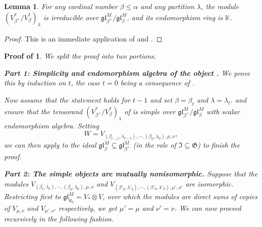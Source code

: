 \documentclass[11pt]{article}
\theoremstyle{plain}
\newtheorem{lemma}{Lemma}[section]
\theoremstyle{nonumberplain}
\theoremstyle{plain}
\theoremstyle{nonumberplain}
\newtheorem{proof}{Proof}
\newtheorem{proof-of-simples}{Proof of \Cref{pr.simples}}
\newcommand\bK{\mathbb K}
\newcommand\fG{\mathfrak{G}}
\newcommand\fgl{\mathfrak{gl}}
\begin{document}
\begin{lemma}\label{le.lambdas}
  For any cardinal number $\beta\le \alpha$ and any partition
  $\lambda$, the module $(V^*_{\beta^+}/V^*_\beta)_\lambda$ is
  irreducible over $\fgl^M_{\beta^+}/\fgl^M_\beta$, and its
  endomorphism ring is $\bK$.
\end{lemma}
\begin{proof}
  This is an immediate application of  and .
\end{proof}






\begin{proof-of-simples}
We split the proof into two portions. 



{\bf Part 1: Simplicity and endomorphism algebra of the object .} We
prove this by induction on $t$, the case $t=0$ being a consequence of \cite[Theorem 4.1]{PS2}.

Now assume that the statement holds for $t-1$ and set $\beta=\beta_t$
and $\lambda=\lambda_t$.  and  ensure that the tensorand
$(V^*_{\beta^+}/V^*_\beta)_\lambda$ of  is
simple over $\fgl^M_{\beta^+}/\fgl^M_{\beta}$ with scalar endomorphism
algebra. Setting
\begin{equation*}
  W={ V_{(\beta_{t-1},\lambda_{t-1}),\cdots,(\beta_{0},\lambda_{0}),\mu,\nu}},
\end{equation*}
we can then apply  to the ideal
$\fgl^M_\beta\subseteq \fgl^M_{\beta^+}$ (in the role of
$\mathfrak{I} \subseteq \fG$) to finish the proof.




{\bf Part 2: The simple objects are mutually nonisomorphic.} Suppose that
the modules
{$ V_{(\beta_t,\lambda_t),\cdots,(\beta_{0},\lambda_{0}),\mu,\nu}$ and
  $V_{(\beta'_q,\lambda'_q),\cdots,(\beta'_{0},\lambda'_{0}),\mu',\nu'}$
  are isomorphic}. Restricting first to $\fgl^M_{\aleph_0}=V_*\otimes V$, over which the
modules are direct sums of copies of $V_{\mu,\nu}$ and $V_{\mu',\nu'}$
respectively, we get $\mu'=\mu$ and $\nu'=\nu$. We can now proceed
recursively in the following fashion.



\end{proof-of-simples}
\end{document}
